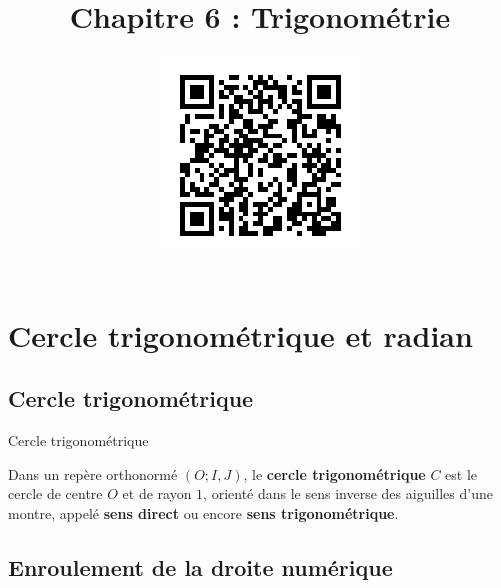 \documentclass[11pt]{article}
\title{\vspace{-10mm}Chapitre 6 : Trigonométrie}
\date{\vspace{-14mm}
\href{https://erou.forge.aeif.fr/spe-1e/trigo.html}{
  \includegraphics[scale=.6]{qrcode.png}}
\vspace{-12mm}}
\author{}
\begin{document}
\maketitle\thispagestyle{fancy}

%

\section{Cercle trigonométrique et radian}
\subsection{Cercle trigonométrique}

\begin{defi}{Cercle trigonométrique}
  \begin{minipage}{.5\textwidth}
    Dans un repère orthonormé $(O; I, J)$, le \textbf{cercle trigonométrique}
    $C$ est le cercle de centre $O$ et de rayon $1$, orienté dans le sens
    inverse des aiguilles d'une montre, appelé \textbf{sens direct} ou encore
    \textbf{sens trigonométrique}.
  \end{minipage}
  \begin{minipage}{.5\textwidth}
    \begin{center}
    \end{center}
  \end{minipage}
\end{defi}

\subsection{Enroulement de la droite numérique}
\end{document}

